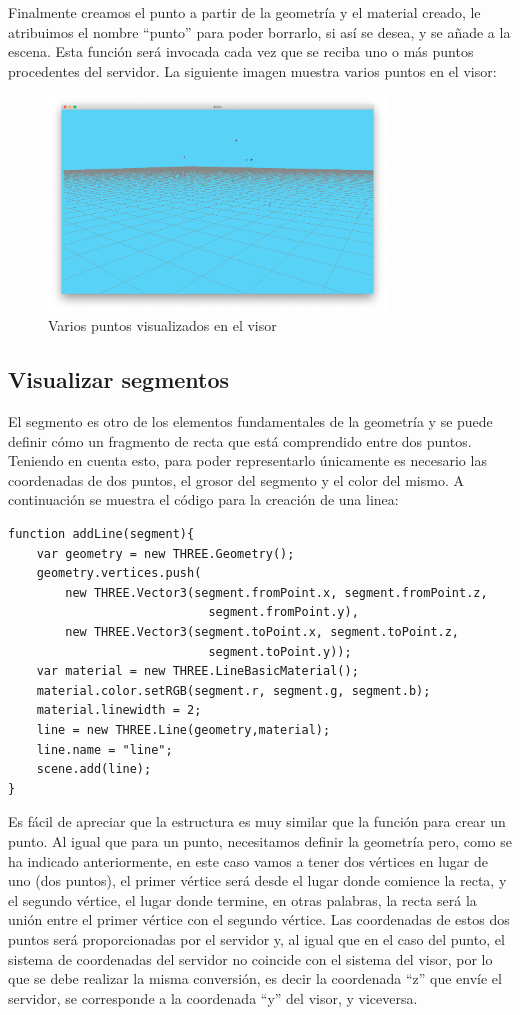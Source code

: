 Finalmente creamos el punto a partir de la geometría y el material creado, le atribuimos el nombre ``punto'' para poder borrarlo, si así se desea, y se añade a la escena.
Esta función será invocada cada vez que se reciba uno o más puntos procedentes del servidor. La siguiente imagen muestra varios puntos en el visor:
\begin{figure}[H]
  \begin{center}
    \includegraphics[width=0.8\textwidth]{figures/visualizarpuntos.png}
		\caption{Varios puntos visualizados en el visor}
		\label{fig.visualizarpuntos}
		\end{center}
\end{figure}
\subsection{Visualizar segmentos}
El segmento es otro de los elementos fundamentales de la geometría y se puede definir cómo un fragmento de recta que está comprendido entre dos puntos. Teniendo en cuenta esto, para poder representarlo únicamente es necesario las coordenadas de dos puntos, el grosor del segmento y el color del mismo. A continuación se muestra el código para la creación de una linea:
\begin{lstlisting}[frame=single]
function addLine(segment){
	var geometry = new THREE.Geometry();
	geometry.vertices.push(
		new THREE.Vector3(segment.fromPoint.x, segment.fromPoint.z, 
							segment.fromPoint.y),
		new THREE.Vector3(segment.toPoint.x, segment.toPoint.z, 
							segment.toPoint.y));
	var material = new THREE.LineBasicMaterial();
	material.color.setRGB(segment.r, segment.g, segment.b);
	material.linewidth = 2;
	line = new THREE.Line(geometry,material);
	line.name = "line";
	scene.add(line);
}
\end{lstlisting}
Es fácil de apreciar que la estructura es muy similar que la función para crear un punto. Al igual que para un punto, necesitamos definir la geometría pero, como se ha indicado anteriormente, en este caso vamos a tener dos vértices en lugar de uno (dos puntos), el primer vértice será desde el lugar donde comience la recta, y el segundo vértice, el lugar donde termine, en otras palabras, la recta será la unión entre el primer vértice con el segundo vértice. Las coordenadas de estos dos puntos será proporcionadas por el servidor y, al igual que en el caso del punto, el sistema de coordenadas del servidor no coincide con el sistema del visor, por lo que se debe realizar la misma conversión, es decir la coordenada ``z'' que envíe el servidor, se corresponde a la coordenada ``y'' del visor, y viceversa.


